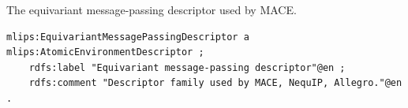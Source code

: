 The equivariant message-passing descriptor used by MACE.
\begin{lstlisting}[language=turtle]
mlips:EquivariantMessagePassingDescriptor a mlips:AtomicEnvironmentDescriptor ;
    rdfs:label "Equivariant message-passing descriptor"@en ;
    rdfs:comment "Descriptor family used by MACE, NequIP, Allegro."@en .
\end{lstlisting}
